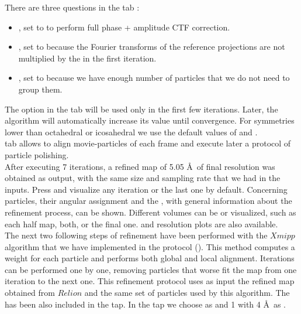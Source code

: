 There are three questions in the tab : 
\begin{itemize}
 \item {}, set to  to perform full phase + amplitude CTF correction.
 \item {}, set to  because the Fourier transforms of the reference projections are not multiplied by the  in the first iteration. 
 \item {}, set to  because we have enough number of particles that we do not need to group them.
\end{itemize}

The  option in the tab  will be used only in the first few iterations. Later, the algorithm will automatically increase its value until convergence. For symmetries lower than octahedral or icosahedral we use the default values of  and .\\

 tab allows to align movie-particles of each frame and execute later a protocol of particle polishing.\\

After executing 7 iterations, a refined map of 5.05 \AA\ of final resolution was obtained as output, with the same size and sampling rate that we had in the inputs. Press  and visualize any iteration or the last one by default. Concerning particles, their angular assignment and the , with general information about the refinement process, can be shown. Different volumes can be  or  visualized, such as each half map, both, or the final one.  and resolution  plots are also available.\\

The next two following steps of refinement have been performed with the $Xmipp$ algorithm  \citep{sorzano2018new} that we have implemented in the protocol  (). This method computes a weight for each particle and performs both global and local alignment. Iterations can be performed one by one, removing particles that worse fit the map from one iteration to the next one. This  refinement protocol uses as input the refined map obtained from $Relion$  and the same set of particles used by this algorithm. The  has been also included in the  tap. In the  tap we choose  as  and 1  with 4 \AA\ as .

